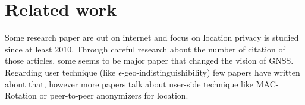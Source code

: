 \documentclass[9pt,conference]{IEEEtran}
\begin{document}

\section{Related work}
Some research paper are out on internet and focus on location privacy is studied since at least 2010. Through careful research about the number of citation of those articles, some seems to be major paper that changed the vision of GNSS. Regarding user technique (like $\epsilon$-geo-indistinguishibility) few papers have written about that, however more papers talk about user-side technique like MAC-Rotation or peer-to-peer anonymizers for location.
\end{document}
